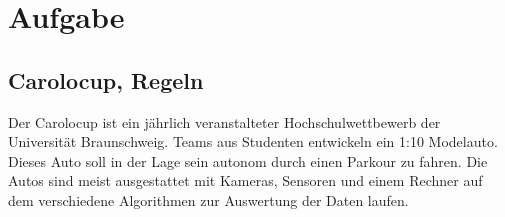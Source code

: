 





\chapter{Aufgabe}
\section{Carolocup, Regeln}
Der Carolocup ist ein jährlich veranstalteter Hochschulwettbewerb der Universität Braunschweig.
Teams aus Studenten entwickeln ein 1:10 Modelauto. 
Dieses Auto soll in der Lage sein autonom durch einen Parkour zu fahren. 
Die Autos sind meist ausgestattet mit Kameras, Sensoren und einem Rechner auf dem verschiedene Algorithmen zur Auswertung der Daten laufen.

